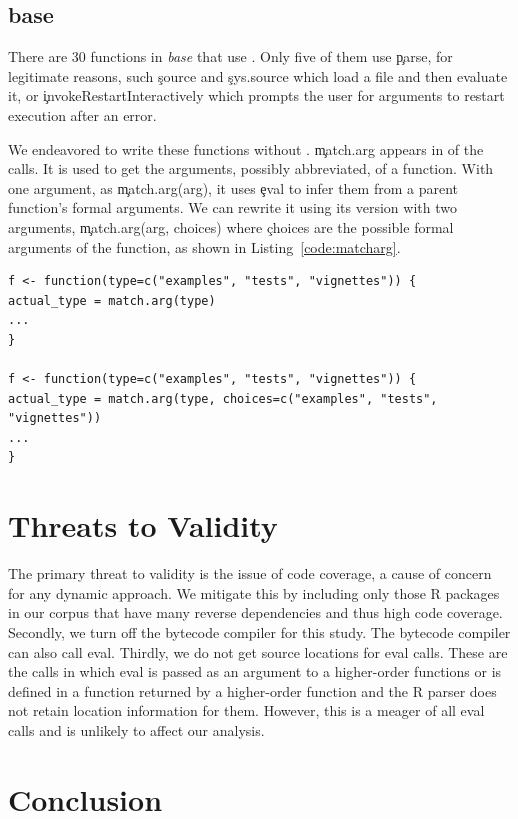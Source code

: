 \documentclass[conference]{IEEEtran}
\begin{document}
\subsection{base}

There are 30 functions in \emph{base} that use \eval. Only five of them use \c{parse}, for legitimate reasons, such \c{source} and \c{sys.source} which load a file and then evaluate it, or \c{invokeRestartInteractively} which prompts the user for arguments to restart execution after an error.

We endeavored  to write these functions without \eval. \c{match.arg} appears in \MatchArgPercent of the \eval calls. It is used to get the arguments, possibly abbreviated, of a function. With one argument, as \c{match.arg(arg)}, it uses \c{eval} to infer them from a parent function's formal arguments. We can rewrite it using its version with two arguments, \c{match.arg(arg, choices)} where \c{choices} are the possible formal arguments of the function, as shown in Listing~\ref{code:matcharg}.

\begin{lstlisting}[caption={Rewriting \c{match.arg} without \eval}, label=code:matcharg]
f <- function(type=c("examples", "tests", "vignettes")) {
actual_type = match.arg(type)
...
}

f <- function(type=c("examples", "tests", "vignettes")) {
actual_type = match.arg(type, choices=c("examples", "tests", "vignettes"))
...
}
\end{lstlisting}

\section{Threats to Validity}
The primary threat to validity is the issue of code coverage, a cause of concern
for any dynamic approach. We mitigate this by including only those R packages in
our corpus that have many reverse dependencies and thus high code coverage.
Secondly, we turn off the bytecode compiler for this study. The bytecode
compiler can also call eval. Thirdly, we do not get source locations for
\UndefinedEvalsRnd eval calls. These are the calls in which eval is passed as an
argument to a higher-order functions or is defined in a function returned by a higher-order function and the R parser does not retain location
information for them. However, this is a meager \PercentUndefinedEval of all eval
calls and is unlikely to affect our analysis.

\section{Conclusion}



\end{document}
